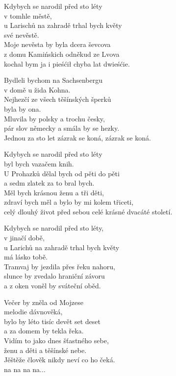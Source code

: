 
\thispagestyle{empty}

\vspace{-5px}
\ve{}
Kdybych se narodil před sto léty  \\
v tomhle městě, \\
u Larischů na zahradě trhal bych květy \\
své nevěstě.\\[2px]
Moje nevěsta by byla dcera ševcova\\
z domu Kamińskich odněkud ze Lvova\\
kochal bym ja i pieśćił chyba lat dwieśćie. 

\vspace{-5px}
\ve{}
Bydleli bychom na Sachsenbergu\\
v domě u žida Kohna.\\
Nejhezčí ze všech těšínských šperků\\
byla by ona.\\[2px]
Mluvila by polsky a trochu česky,\\
pár slov německy a smála by se hezky.\\
Jednou za sto let zázrak se koná, zázrak se koná.

\vspace{-5px}
\ve{}
Kdybych se narodil před sto léty\\
byl bych vazačem knih.\\
U Prohazků dělal bych od pěti do pěti\\
a sedm zlatek za to bral bych.\\[2px]
Měl bych krásnou ženu a tři děti,\\
zdraví bych měl a bylo by mi kolem třiceti,\\
celý dlouhý život před sebou celé krásné dvacáté století.

\vspace{-5px}
\ve{}
Kdybych se narodil před sto léty,\\
v jinačí době,\\
u Larichů na zahradě trhal bych květy\\
má lásko tobě.\\[2px]
Tramvaj by jezdila přes řeku nahoru,\\
slunce by zvedalo hraniční závoru\\
a z oken voněl by sváteční oběd.

\vspace{-5px}
\ve{}
Večer by zněla od Mojzese\\
melodie dávnověká,\\
bylo by léto tisíc devět set deset\\
a za domem by tekla řeka.\\[2px]
Vidím to jako dnes šťastného sebe,\\
ženu a děti a těšínské nebe.\\
Jěštěže člověk nikdy neví co ho čeká.\\[2px]
na na na na... 

\esong{}
\restoregeometry{}
